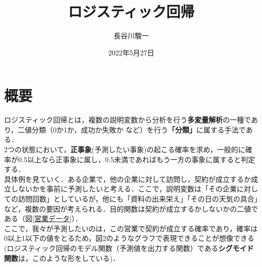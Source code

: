 \documentclass[a4j, 11pt]{jsarticle}
\title{ロジスティック回帰}
\author{長谷川駿一}
\date{2022年5月27日 }
\numberwithin{equation}{section}
\begin{document}
\maketitle
\section{概要}
\indent ロジスティック回帰とは，複数の説明変数から分析を行う\textbf{多変量解析}の一種であり，二値分類（0か1か，成功か失敗か など）を行う\textbf{「分類」}に属する手法である．\\
\indent 2つの状態において，\textbf{正事象}(予測したい事象)の起こる確率を求め，一般的に確率が0.5以上なら正事象に属し，0.5未満であればもう一方の事象に属すると判定する．\\
\indent 具体例を見ていく．ある企業で，他の企業に対して訪問し，契約が成立するか成立しないかを事前に予測したいと考える．ここで，説明変数は「その企業に対しての訪問回数」としているが，他にも「資料の出来栄え」「その日の天気の具合」など，複数の要因が考えられる．目的関数は契約が成立するかしないかの二値である（図\ref{営業データ}）．\\
\indent ここで，我々が予測したいのは，この営業で契約が成立する確率であり，確率は0以上1以下の値をとるため，図2のようなグラフで表現できることが想像できる(ロジスティック回帰のモデル関数（予測値を出力する関数）である\textbf{シグモイド関数}は，このような形をしている)．\\
\end{document}
